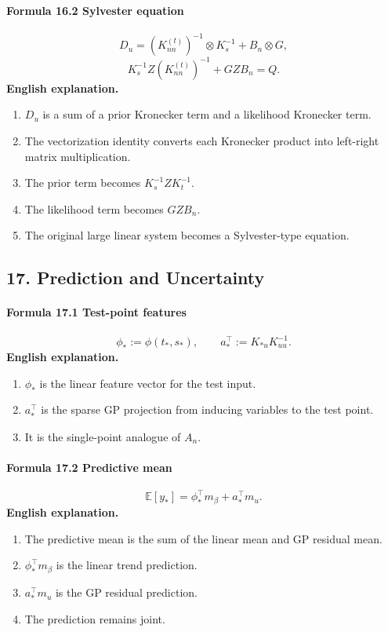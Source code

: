 \documentclass[12pt]{article}
\begin{document}
\paragraph{Formula 16.2 Sylvester equation}
\[
D_u=(K_{nn}^{(t)})^{-1}\otimes K_s^{-1}+B_n\otimes G,
\]
\[
K_s^{-1}Z(K_{nn}^{(t)})^{-1}+GZB_n=Q.
\]
\textbf{English explanation.}
\begin{enumerate}[leftmargin=2em]
\item \(D_u\) is a sum of a prior Kronecker term and a likelihood Kronecker term.
\item The vectorization identity converts each Kronecker product into left-right matrix multiplication.
\item The prior term becomes \(K_s^{-1}ZK_t^{-1}\).
\item The likelihood term becomes \(GZB_n\).
\item The original large linear system becomes a Sylvester-type equation.
\end{enumerate}

\subsection{17. Prediction and Uncertainty}
\paragraph{Formula 17.1 Test-point features}
\[
\phi_*:=\phi(t_*,s_*),
\qquad
a_*^\top:=K_{*u}K_{uu}^{-1}.
\]
\textbf{English explanation.}
\begin{enumerate}[leftmargin=2em]
\item \(\phi_*\) is the linear feature vector for the test input.
\item \(a_*^\top\) is the sparse GP projection from inducing variables to the test point.
\item It is the single-point analogue of \(A_n\).
\end{enumerate}

\paragraph{Formula 17.2 Predictive mean}
\[
\mathbb E[y_*]
=
\phi_*^\top m_\beta+a_*^\top m_u.
\]
\textbf{English explanation.}
\begin{enumerate}[leftmargin=2em]
\item The predictive mean is the sum of the linear mean and GP residual mean.
\item \(\phi_*^\top m_\beta\) is the linear trend prediction.
\item \(a_*^\top m_u\) is the GP residual prediction.
\item The prediction remains joint.
\end{enumerate}
\end{document}
